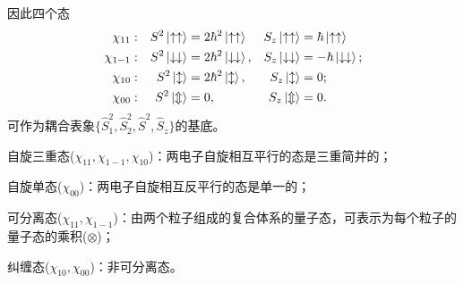因此四个态
\begin{align*}
	\chi_{11}&:&S^2\left\vert \uparrow\uparrow\right\rangle&=2\hbar^2\left\vert \uparrow\uparrow\right\rangle&S_z\left\vert \uparrow\uparrow\right\rangle&=\hbar\left\vert \uparrow\uparrow\right\rangle\\
	\chi_{1-1}&:&S^2\left\vert \downarrow\downarrow\right\rangle&=2\hbar^2\left\vert \downarrow\downarrow\right\rangle,&S_z\left\vert \downarrow\downarrow\right\rangle&=-\hbar\left\vert \downarrow\downarrow\right\rangle;\\
	\chi_{10}&:&S^2\left\vert \updownarrow\right\rangle&=2\hbar^2\left\vert \updownarrow\right\rangle,&S_z\left\vert \updownarrow\right\rangle&=0;\\
	\chi_{00}&:&S^2\left\vert \Updownarrow\right\rangle&=0,&S_z\left\vert \Updownarrow\right\rangle&=0.
\end{align*}
可作为耦合表象$\{\hat S_1^2,\hat S_2^2,\hat S^2,\hat S_z\}$的基底。
\begin{compactitem}
	\item 自旋三重态($\chi_{11},\chi_{1-1},\chi_{10}$)：两电子自旋相互平行的态是三重简并的；
	\item 自旋单态($\chi_{00}$)：两电子自旋相互反平行的态是单一的；
	\item 可分离态($\chi_{11},\chi_{1-1}$)：由两个粒子组成的复合体系的量子态，可表示为每个粒子的量子态的乘积($\otimes$)；
	\item 纠缠态($\chi_{10},\chi_{00}$)：非可分离态。
\end{compactitem}